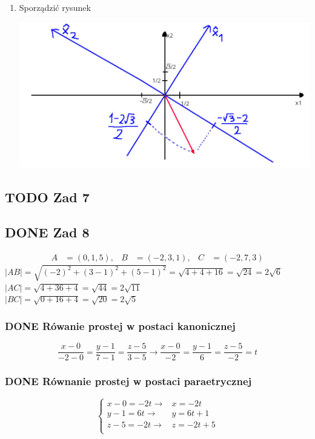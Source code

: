 \documentclass[11pt]{article}
\begin{document}
\begin{enumerate}
\item Sporządzić rysunek
\label{sec:org93cd3ef}
\begin{center}
\includegraphics[width=.9\linewidth]{img/zad6.jpg}
\end{center}
\end{enumerate}
\subsection{{\bfseries\sffamily TODO} Zad 7}
\label{sec:org0e2b6ac}
\subsection{{\bfseries\sffamily DONE} Zad 8}
\label{sec:org41f519c}
\begin{align*}
A&=(0,1,5),& B&=(-2,3,1),& C&=(-2, 7,3)
\end{align*}
\(|AB| = \sqrt{(-2)^{2} + (3-1)^{2} + (5 -1)^{2}} = \sqrt{4 + 4 +16} = \sqrt{24} = 2\sqrt{6}\)
\\\empty
\(|AC| = \sqrt{ 4 + 36 + 4} = \sqrt{44} = 2 \sqrt{11}\)
\\\empty
\(|BC| = \sqrt{0 + 16 + 4} = \sqrt{20} = 2\sqrt{5}\)
\subsubsection{{\bfseries\sffamily DONE} Rówanie prostej w postaci kanonicznej}
\label{sec:org3056648}
$$\frac{x - 0}{-2 - 0} = \frac{y - 1}{7 - 1} = \frac{z - 5}{3 -5}
\to \frac{x - 0}{-2} = \frac{y - 1}{6} = \frac{z - 5}{-2}
= t$$
\subsubsection{{\bfseries\sffamily DONE} Równanie prostej w postaci paraetrycznej}
\label{sec:orgbe2ca0a}
\[\begin{cases}
x-0 = -2t \to & x = -2t\\
y - 1 = 6t \to & y = 6t +1\\
z -5 = -2t \to & z = -2t + 5\\
\end{cases}\]
\end{document}
